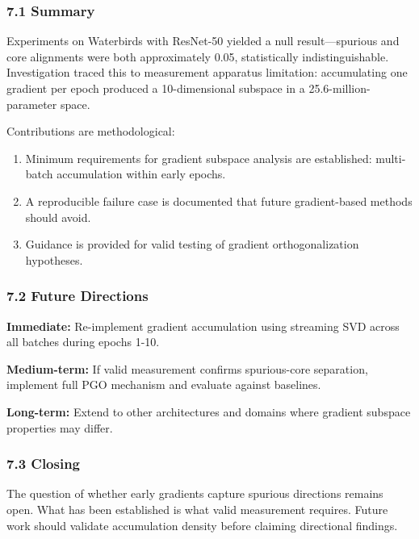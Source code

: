 
\subsubsection{7.1 Summary}

Experiments on Waterbirds with ResNet-50 yielded a null result---spurious and core alignments were both approximately 0.05, statistically indistinguishable. Investigation traced this to measurement apparatus limitation: accumulating one gradient per epoch produced a 10-dimensional subspace in a 25.6-million-parameter space.

Contributions are methodological:

\begin{enumerate}
\item Minimum requirements for gradient subspace analysis are established: multi-batch accumulation within early epochs.
\item A reproducible failure case is documented that future gradient-based methods should avoid.
\item Guidance is provided for valid testing of gradient orthogonalization hypotheses.
\end{enumerate}

\subsubsection{7.2 Future Directions}

\textbf{Immediate:} Re-implement gradient accumulation using streaming SVD across all batches during epochs 1-10.

\textbf{Medium-term:} If valid measurement confirms spurious-core separation, implement full PGO mechanism and evaluate against baselines.

\textbf{Long-term:} Extend to other architectures and domains where gradient subspace properties may differ.

\subsubsection{7.3 Closing}

The question of whether early gradients capture spurious directions remains open. What has been established is what valid measurement requires. Future work should validate accumulation density before claiming directional findings.


